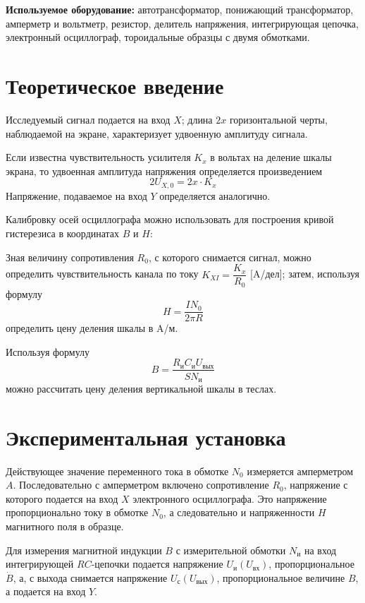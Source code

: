 \documentclass[a4paper, 12pt]{article}%
\begin{document}
\textbf{Используемое оборудование:} автотрансформатор, понижающий трансформатор, амперметр и вольтметр, резистор, делитель напряжения, интегрирующая цепочка, электронный осциллограф, тороидальные образцы с двумя обмотками.
                    
\section{Теоретическое введение}

Исследуемый сигнал подается на вход $X$; длина $2x$ горизонтальной черты, наблюдаемой на экране, характеризует удвоенную амплитуду сигнала. 

Если известна чувствительность усилителя $K_x$ в вольтах на деление шкалы экрана, то удвоенная амплитуда напряжения определяется произведением
\[2U_{X, 0} = 2x \cdot K_x\]
Напряжение, подаваемое на вход $Y$ определяется аналогично. 

Калибровку осей осциллографа можно использовать для построения кривой гистерезиса в координатах $B$ и $H$:

Зная величину сопротивления $R_0$, с которого снимается сигнал, можно определить чувствительность канала по току $K_{XI} = \dfrac{K_x}{R_0}$ [A/дел]; затем, используя формулу 
\begin{equation}
H = \dfrac{IN_0}{2\pi R}
\end{equation}
определить цену деления шкалы в A/м.

Используя формулу 
\begin{equation}
B = \dfrac{R_{\text{и}}C_{\text{и}}U_{\text{вых}}}{SN_{\text{и}}}
\end{equation}
можно рассчитать цену деления вертикальной шкалы в теслах.

\section{Экспериментальная установка}

Действующее значение переменного тока в обмотке $N_0$ измеряется амперметром $A$. Последовательно с амперметром включено сопротивление $R_0$, напряжение с которого подается на вход $X$ электронного осциллографа. Это напряжение пропорционально току в обмотке $N_0$, а следовательно и напряженности $H$ магнитного поля в образце.

Для измерения магнитной индукции $B$ с измерительной обмотки $N_{\text{и}}$ на вход интегрирующей $RC$-цепочки подается напряжение $U_{\text{и}}(U_{\text{вх}})$, пропорциональное $\dot{B}$, а, с выхода снимается напряжение $U_{\text{с}}(U_{\text{вых}})$, пропорциональное величине $B$, а подается на вход $Y$.
\end{document}
